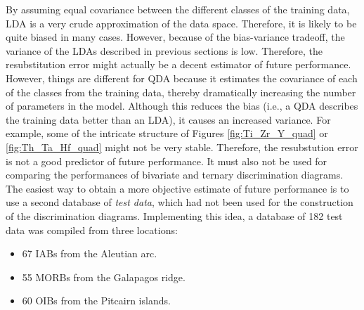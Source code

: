 \documentclass{article}
\begin{document}
By  assuming equal  covariance between  the different  classes  of the
training data,  LDA is a very  crude approximation of  the data space.
Therefore, it  is likely  to be quite  biased in many  cases. However,
because  of  the bias-variance  tradeoff,  the  variance  of the  LDAs
described in previous sections  is low.  Therefore, the resubstitution
error  might actually  be a  decent estimator  of  future performance.
However,  things  are  different  for  QDA because  it  estimates  the
covariance  of each  of the  classes from  the training  data, thereby
dramatically  increasing  the  number  of  parameters  in  the  model.
Although this  reduces the  bias (i.e., a  QDA describes  the training
data  better than  an  LDA),  it causes  an  increased variance.   For
example,    some    of   the    intricate    structure   of    Figures
\ref{fig:Ti_Zr_Y_quad}  or \ref{fig:Th_Ta_Hf_quad}  might not  be very
stable. Therefore, the  resubstution error is not a  good predictor of
future  performance.  It  must  also  not be  used  for comparing  the
performances of bivariate and ternary discrimination diagrams.\\

The  easiest  way  to  obtain  a more  objective  estimate  of  future
performance is to use a second  database of {\it test data}, which had
not   been   used  for   the   construction   of  the   discrimination
diagrams.  Implementing this  idea, a  database of  182 test  data was
compiled from three locations:

\begin{itemize}
\item 67 IABs from the Aleutian arc.
\item 55 MORBs from the Galapagos ridge.
\item 60 OIBs from the Pitcairn islands.
\end{itemize}
\end{document}
